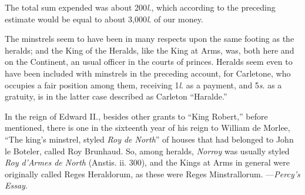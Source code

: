 \renewcommand\versoheader{english minstrelsy.}
\renewcommand\rectoheader{edward ii.}



The total sum expended was about 200\textit{l}., which according to the preceding
estimate would be equal to about 3,000\textit{l}. of our money.

The minstrels seem to have been in many respects upon the same footing as the
heralds; and the King of the Heralds, like the King at Arms, was, both here and
on the Continent, an usual officer in the courts of princes. Heralds seem even to
have been included with minstrels in the preceding account, for Carletone, who
occupies a fair position among them, receiving 1\textit{l}. as a payment, and 5\textit{s}. as a
gratuity, is in the latter case described as Carleton “Haralde.”

In the reign of Edward II., besides other grants to “King Robert,” before
mentioned, there is one in the sixteenth year of his reign to William de Morlee,
“The king’s minstrel, styled \textit{Roy de North}” of houses that had belonged to
John le Boteler, called Roy Brunhaud. So, among heralds, \textit{Norroy} was usually
styled \textit{Roy d'Armes de North} (Anstis. ii. 300), and the Kings at Arms in general
were originally called Reges Heraldorum, as these were Reges Minstrallorum. %
—\textit{Percy's Essay}.

